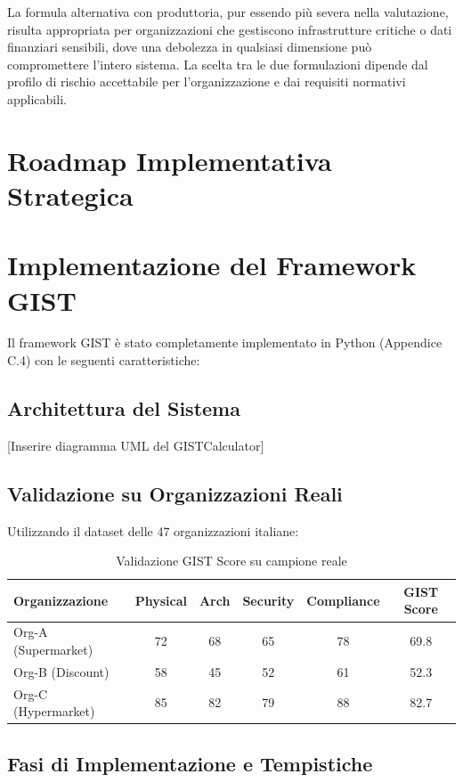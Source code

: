 La formula alternativa con produttoria, pur essendo più severa nella valutazione, risulta appropriata per organizzazioni che gestiscono infrastrutture critiche o dati finanziari sensibili, dove una debolezza in qualsiasi dimensione può compromettere l'intero sistema. La scelta tra le due formulazioni dipende dal profilo di rischio accettabile per l'organizzazione e dai requisiti normativi applicabili.

\section{\texorpdfstring{Roadmap Implementativa Strategica}{5.4 - Roadmap Implementativa Strategica}}
\label{sec:5.4}

\section{Implementazione del Framework GIST}
\label{sec:gist_implementation}

Il framework GIST è stato completamente implementato in Python 
(Appendice C.4) con le seguenti caratteristiche:

\subsection{Architettura del Sistema}
[Inserire diagramma UML del GISTCalculator]

\subsection{Validazione su Organizzazioni Reali}
Utilizzando il dataset delle 47 organizzazioni italiane:

\begin{table}[htbp]
\caption{Validazione GIST Score su campione reale}
\begin{tabular}{lccccc}
\toprule
Organizzazione & Physical & Arch & Security & Compliance & GIST Score \\
\midrule
Org-A (Supermarket) & 72 & 68 & 65 & 78 & 69.8 \\
Org-B (Discount) & 58 & 45 & 52 & 61 & 52.3 \\
Org-C (Hypermarket) & 85 & 82 & 79 & 88 & 82.7 \\
\bottomrule
\end{tabular}
\end{table}

\subsection{\texorpdfstring{Fasi di Implementazione e Tempistiche}{5.4.1 - Fasi di Implementazione e Tempistiche}}
\label{subsec:5.4.1}

